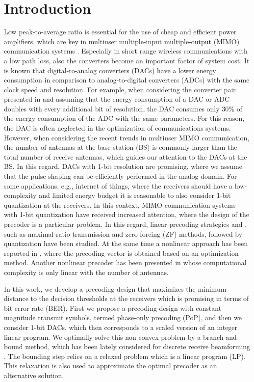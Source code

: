 \documentclass[journal,comsoc]{IEEEtran}
\begin{document}
\vspace{-1em}
\section{Introduction}
Low peak-to-average ratio is essential for the use of cheap and efficient power amplifiers, which are key in
multiuser multiple-input multiple-output (MIMO) communication systems \cite{Spencer_2004}.
Especially in short range wireless communications with a low path loss, also the converters become an important factor of system cost.
It is known that digital-to-analog converters (DACs) have a lower energy consumption in comparison to analog-to-digital converters (ADCs) with the same clock speed and resolution. For example, when considering the converter pair presented in \cite{Naber_1989} and assuming that the energy consumption of a DAC or ADC doubles with every additional bit of resolution, the DAC consumes only $30\%$ of the energy consumption of the ADC with the same parameters. 
For this reason, the DAC is often neglected in the optimization of communications systems.
However, when considering the recent trends in multiuser MIMO communication, the number of antennas at the base station (BS) is commonly larger than the total number of receive antennas, which guides our attention to the DACs at the BS.
In this regard, DACs with 1-bit resolution are promising, where we assume that the pulse shaping can be efficiently performed in the analog domain.    
For some applications, e.g., internet of things, where the receivers should have a low-complexity and limited energy budget it is reasonable to also consider 1-bit quantization at the receivers.
In this context, MIMO communication systems with 1-bit quantization have received increased attention, where the design of the precoder is a particular problem.
In this regard, linear precoding strategies \cite{Saxena_2016} and \cite{JacobssonDCGS16a}, such as maximal-ratio transmission and zero-forcing (ZF) methods, followed by quantization have been studied. At the same time a nonlinear approach has been reported in \cite{Jedda_2016}, where the precoding vector is obtained based on an optimization method. Another nonlinear precoder has been presented in \cite{Tirkonnen_2017} whose computational complexity is only linear with the number of antennas.

In this work, we develop a precoding design that maximizes the minimum distance to the decision thresholds at the receivers which is promising in terms of bit error rate (BER). First we propose a precoding design with constant magnitude transmit symbols, termed phase-only precoding (PoP), and then we consider 1-bit DACs, which then corresponds to a scaled version of an integer linear program. We optimally solve this non convex problem by a branch-and-bound method, which has been lately considered for discrete receive beamforming \cite{Israel_2015_Letter}.
The bounding step relies on a relaxed problem which is a linear program (LP). This relaxation is also used to approximate the optimal precoder as an alternative solution.
\end{document}
